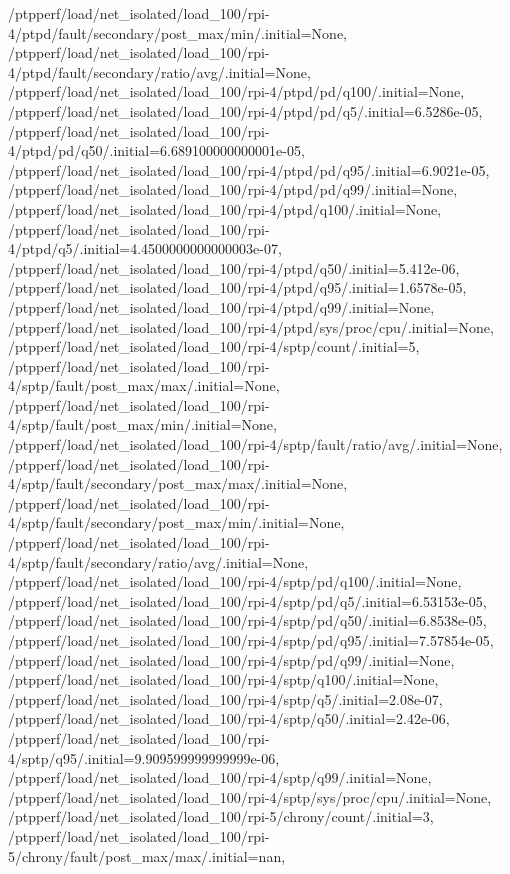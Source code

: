 {    /ptpperf/load/net_isolated/load_100/rpi-4/ptpd/fault/secondary/post_max/min/.initial=None,
    /ptpperf/load/net_isolated/load_100/rpi-4/ptpd/fault/secondary/ratio/avg/.initial=None,
    /ptpperf/load/net_isolated/load_100/rpi-4/ptpd/pd/q100/.initial=None,
    /ptpperf/load/net_isolated/load_100/rpi-4/ptpd/pd/q5/.initial=6.5286e-05,
    /ptpperf/load/net_isolated/load_100/rpi-4/ptpd/pd/q50/.initial=6.689100000000001e-05,
    /ptpperf/load/net_isolated/load_100/rpi-4/ptpd/pd/q95/.initial=6.9021e-05,
    /ptpperf/load/net_isolated/load_100/rpi-4/ptpd/pd/q99/.initial=None,
    /ptpperf/load/net_isolated/load_100/rpi-4/ptpd/q100/.initial=None,
    /ptpperf/load/net_isolated/load_100/rpi-4/ptpd/q5/.initial=4.4500000000000003e-07,
    /ptpperf/load/net_isolated/load_100/rpi-4/ptpd/q50/.initial=5.412e-06,
    /ptpperf/load/net_isolated/load_100/rpi-4/ptpd/q95/.initial=1.6578e-05,
    /ptpperf/load/net_isolated/load_100/rpi-4/ptpd/q99/.initial=None,
    /ptpperf/load/net_isolated/load_100/rpi-4/ptpd/sys/proc/cpu/.initial=None,
    /ptpperf/load/net_isolated/load_100/rpi-4/sptp/count/.initial=5,
    /ptpperf/load/net_isolated/load_100/rpi-4/sptp/fault/post_max/max/.initial=None,
    /ptpperf/load/net_isolated/load_100/rpi-4/sptp/fault/post_max/min/.initial=None,
    /ptpperf/load/net_isolated/load_100/rpi-4/sptp/fault/ratio/avg/.initial=None,
    /ptpperf/load/net_isolated/load_100/rpi-4/sptp/fault/secondary/post_max/max/.initial=None,
    /ptpperf/load/net_isolated/load_100/rpi-4/sptp/fault/secondary/post_max/min/.initial=None,
    /ptpperf/load/net_isolated/load_100/rpi-4/sptp/fault/secondary/ratio/avg/.initial=None,
    /ptpperf/load/net_isolated/load_100/rpi-4/sptp/pd/q100/.initial=None,
    /ptpperf/load/net_isolated/load_100/rpi-4/sptp/pd/q5/.initial=6.53153e-05,
    /ptpperf/load/net_isolated/load_100/rpi-4/sptp/pd/q50/.initial=6.8538e-05,
    /ptpperf/load/net_isolated/load_100/rpi-4/sptp/pd/q95/.initial=7.57854e-05,
    /ptpperf/load/net_isolated/load_100/rpi-4/sptp/pd/q99/.initial=None,
    /ptpperf/load/net_isolated/load_100/rpi-4/sptp/q100/.initial=None,
    /ptpperf/load/net_isolated/load_100/rpi-4/sptp/q5/.initial=2.08e-07,
    /ptpperf/load/net_isolated/load_100/rpi-4/sptp/q50/.initial=2.42e-06,
    /ptpperf/load/net_isolated/load_100/rpi-4/sptp/q95/.initial=9.909599999999999e-06,
    /ptpperf/load/net_isolated/load_100/rpi-4/sptp/q99/.initial=None,
    /ptpperf/load/net_isolated/load_100/rpi-4/sptp/sys/proc/cpu/.initial=None,
    /ptpperf/load/net_isolated/load_100/rpi-5/chrony/count/.initial=3,
    /ptpperf/load/net_isolated/load_100/rpi-5/chrony/fault/post_max/max/.initial=nan,
}
